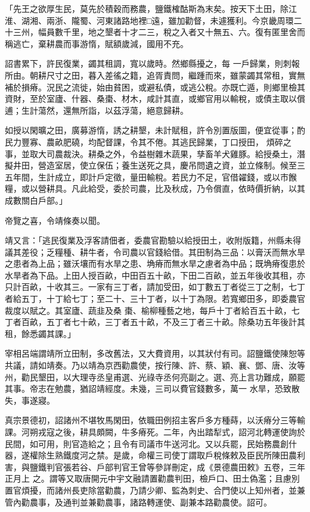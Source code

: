\begin{pinyinscope}
 「先王之欲厚生民，莫先於積穀而務農，鹽鐵榷酤斯為末矣。按天下土田，除江淮、湖湘、兩浙、隴蜀、河東諸路地裡□遠，雖加勸督，未遽獲利。今京畿周環二十三州，幅員數千里，地之墾者十才二三，稅之入者又十無五、六。復有匿里舍而稱逃亡，棄耕農而事游惰，賦額歲減，國用不充。



 詔書累下，許民復業，蠲其租調，寬以歲時。然鄉縣擾之，每
 一戶歸業，則刺報所由。朝耕尺寸之田，暮入差徭之籍，追胥責問，繼踵而來，雖蒙蠲其常租，實無補於損瘠。況民之流徙，始由貧困，或避私債，或逃公稅。亦既亡遁，則鄉里檢其資財，至於室廬、什器、桑棗、材木，咸計其直，或鄉官用以輸稅，或債主取以償逋；生計蕩然，還無所詣，以茲浮蕩，絕意歸耕。



 如授以閑曠之田，廣募游惰，誘之耕墾，未計賦租，許令別置版圖，便宜從事；酌民力豐寡、農畝肥磽，均配督課，令其不倦。其逃民歸業，丁口授田，
 煩碎之事，並取大司農裁決。耕桑之外，令益樹雜木蔬果，孳畜羊犬雞豚。給授桑土，潛擬井田，營造室居，使立保伍；養生送死之具，慶吊問遺之資，並立條制。候至三五年間，生計成立，即計戶定徵，量田輸稅。若民力不足，官借糴錢，或以市餱糧，或以營耕具。凡此給受，委於司農，比及秋成，乃令償直，依時價折納，以其成數關白戶部。」



 帝覽之喜，令靖條奏以聞。



 靖又言：「逃民復業及浮客請佃者，委農官勘驗以給授田土，收附版籍，州縣未得
 議其差役；乏糧種、耕牛者，令司農以官錢給借。其田制為三品：以膏沃而無水旱之患者為上品；雖沃壤而有水旱之患、埆瘠而無水旱之慮者為中品；既埆瘠復患於水旱者為下品。上田人授百畝，中田百五十畝，下田二百畝，並五年後收其租，亦只計百畝，十收其三。一家有三丁者，請加受田，如丁數五丁者從三丁之制，七丁者給五丁，十丁給七丁；至二十、三十丁者，以十丁為限。若寬鄉田多，即委農官裁度以賦之。其室廬、蔬韭及桑
 棗、榆柳種藝之地，每戶十丁者給百五十畝，七丁者百畝，五丁者七十畝，三丁者五十畝，不及三丁者三十畝。除桑功五年後計其租，餘悉蠲其課。」



 宰相呂端謂靖所立田制，多改舊法，又大費資用，以其狀付有司。詔鹽鐵使陳恕等共議，請如靖奏。乃以靖為京西勸農使，按行陳、許、蔡、穎、襄、鄧、唐、汝等州，勸民墾田，以大理寺丞皇甫選、光祿寺丞何亮副之。選、亮上言功難成，願罷其事。帝志在勉農，猶詔靖經度。未幾，三司以費官錢數多，萬一
 水旱，恐致散失，事遂寢。



 真宗景德初，詔諸州不堪牧馬閑田，依職田例招主客戶多方種蒔，以沃瘠分三等輸課。河朔戎寇之後，耕具頗闕，牛多瘠死。二年，內出踏犁式，詔河北轉運使詢於民間，如可用，則官造給之；且令有司議市牛送河北。又以兵罷，民始務農創什器，遂權除生熟鐵度河之禁。是歲，命權三司使丁謂取戶稅條敕及臣民所陳田農利害，與鹽鐵判官張若谷、戶部判官王曾等參詳刪定，成《景德農田敕》五卷，三年正月上
 之。謂等又取唐開元中宇文融請置勸農判田，檢戶口、田土偽濫；且慮別置官煩擾，而諸州長吏除當勸農，乃請少卿、監為刺史、合門使以上知州者，並兼管內勸農事，及通判並兼勸農事，諸路轉運使、副兼本路勸農使。詔可。




\end{pinyinscope}
